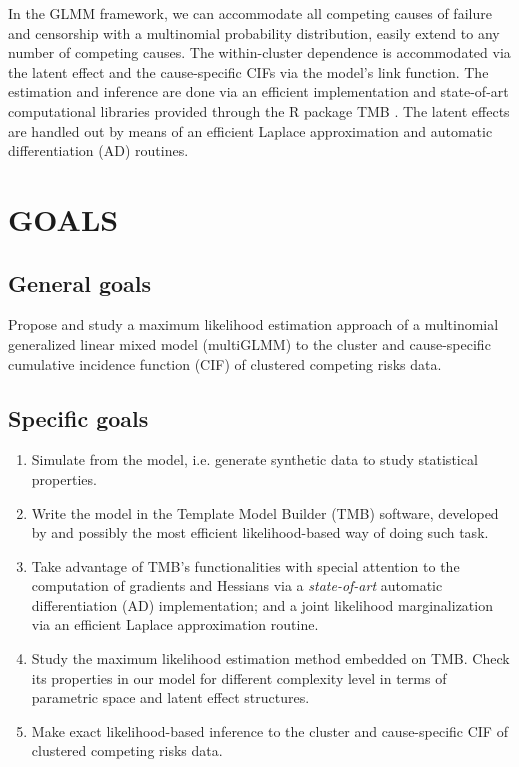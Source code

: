 In the GLMM framework, we can accommodate all competing causes of
failure and censorship with a multinomial probability distribution,
easily extend to any number of competing causes. The within-cluster
dependence is accommodated via the latent effect and the cause-specific
CIFs via the model's link function. The estimation and inference are
done via an efficient implementation and state-of-art computational
libraries provided through the R \cite{R21} package TMB \cite{TMB}. The
latent effects are handled out by means of an efficient Laplace
approximation \cite{corestats,patrao} and automatic differentiation (AD)
\cite{corestats,peyre} routines.

\section{GOALS}

\subsection{General goals}

Propose and study a maximum likelihood estimation approach of a
multinomial generalized linear mixed model (multiGLMM) to the cluster
and cause-specific cumulative incidence function (CIF) of clustered
competing risks data.

\subsection{Specific goals}

\begin{enumerate}
 \item Simulate from the model, i.e. generate synthetic data to study
       statistical properties.

 \item Write the model in the Template Model Builder (TMB) software,
       developed by  and possibly the most efficient
       likelihood-based way of doing such task.

 \item Take advantage of TMB's functionalities with special attention to
       the computation of gradients and Hessians via a
       \textit{state-of-art} automatic differentiation (AD)
       implementation; and a joint likelihood marginalization via an
       efficient Laplace approximation routine.

 \item Study the maximum likelihood estimation method embedded on TMB.
       Check its properties in our model for different complexity level
       in terms of parametric space and latent effect structures.

 \item Make exact likelihood-based inference to the cluster and
       cause-specific CIF of clustered competing risks data.
\end{enumerate}

